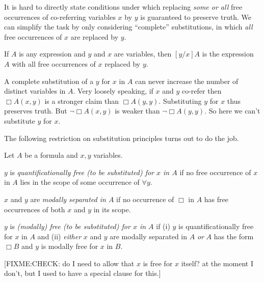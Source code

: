 \documentclass[11pt]{woarticle}
\newcommand{\cmnt}[1]{\iffalse #1 \fi}
\theoremstyle{break}
\theoremstyle{nonumberplain}
\newcommand{\1}{\;\,|\;\,}
\begin{document}
It is hard to directly state conditions under which replacing \emph{some or all}
free occurrences of co-referring variables $x$ by $y$ is guaranteed to preserve
truth. We can simplify the task by only considering ``complete'' substitutions,
in which \emph{all} free occurrences of $x$ are replaced by $y$.

\begin{definition}[Substitution]\label{!SUBSTITUTION}
  If $A$ is any expression and $y$ and $x$ are variables, then $[y/x]A$ is the
  expression $A$ with all free occurrences of $x$ replaced by $y$.
\end{definition}

A complete substitution of a $y$ for $x$ in $A$ can never increase the number of
distinct variables in $A$. Very loosely speaking, if $x$ and $y$ co-refer then
$\Box A(x,y)$ is a stronger claim than $\Box A(y,y)$. Substituting $y$ for $x$
thus preserves truth. But $\neg \Box A(x,y)$ is weaker than $\neg\Box A(y,y)$.
So here we can't substitute $y$ for $x$.

The following restriction on substitution principles turns out to do the job.

\begin{definition}\label{!MF}
  Let $A$ be a formula and $x,y$ variables.
  
  $y$ is \emph{quantificationally free (to be substituted) for $x$ in $A$} if no free
  occurrence of $x$ in $A$ lies in the scope of some occurrence of $\forall y$.

  $x$ and $y$ are \emph{modally separated in $A$} if no occurrence of $\Box$ in
  $A$ has free occurrences of both $x$ and $y$ in its scope.

  \cmnt{(It is allowed that $x$ and $y$ both occur freely in the scope
    of a modal operator in $A$, as long as at least one of them is
    bound from outside that operator, as in $A = \forall x \Box
    Gxy$.)}

  $y$ is \emph{(modally) free (to be substituted) for $x$ in $A$} if (i) $y$ is
  quantificationally free for $x$ in $A$ and (ii) \emph{either} $x$ and $y$ are modally
  separated in $A$ \emph{or} $A$ has the form $\Box B$ and $y$ is modally free
  for $x$ in $B$.

  [FIXME:CHECK: do I need to allow that $x$ is free for $x$ itself? at the moment I don't, but I used to have a special clause for this.]
\end{definition}
\end{document}

